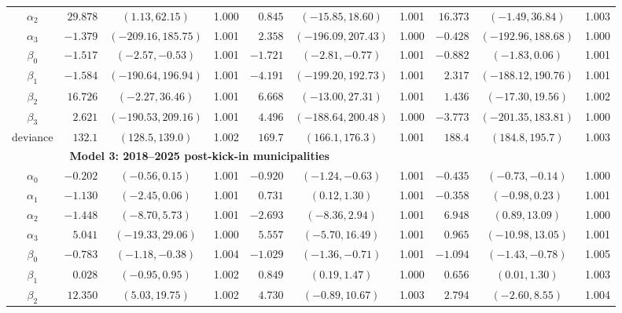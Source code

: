 \documentclass[letter,12pt]{article}
\newcommand{\mc}{\multicolumn}
\begin{document}
\begin{table}
{\begin{tabular}{c|rcr|rcr|rcr}
$\alpha_2$&  $29.878$ &     $(1.13, 62.15)$ & 1.000 & $ 0.845$ &        $(-15.85, 18.60)$ & 1.001 & $16.373$ &         $(-1.49, 36.84)$ & 1.003 \\
$\alpha_3$&  $-1.379$ & $(-209.16, 185.75)$ & 1.001 & $ 2.358$ &      $(-196.09, 207.43)$ & 1.000 & $-0.428$ &      $(-192.96, 188.68)$ & 1.000 \\
 $\beta_0$&  $-1.517$ &    $(-2.57, -0.53)$ & 1.001 & $-1.721$ &         $(-2.81, -0.77)$ & 1.001 & $-0.882$ &          $(-1.83, 0.06)$ & 1.001 \\
 $\beta_1$&  $-1.584$ & $(-190.64, 196.94)$ & 1.001 & $-4.191$ &      $(-199.20, 192.73)$ & 1.001 & $ 2.317$ &      $(-188.12, 190.76)$ & 1.001 \\
 $\beta_2$&  $16.726$ &    $(-2.27, 36.46)$ & 1.001 & $ 6.668$ &        $(-13.00, 27.31)$ & 1.001 & $ 1.436$ &        $(-17.30, 19.56)$ & 1.002 \\
 $\beta_3$&  $ 2.621$ & $(-190.53, 209.16)$ & 1.001 & $ 4.496$ &      $(-188.64, 200.48)$ & 1.000 & $-3.773$ &      $(-201.35, 183.81)$ & 1.000 \\
deviance  &  $ 132.1$ &      $(128.5, 139.0)$ & 1.002 & $ 169.7$ &           $(166.1, 176.3)$ & 1.001 & $ 188.4$ &           $(184.8, 195.7)$ & 1.003 \\
  & \mc{5}{l}{~\textbf{Model 3: 2018--2025 post-kick-in municipalities}} \\ %
$\alpha_0$&  $-0.202$ &     $(-0.56, 0.15)$ & 1.001 & $-0.920$ &         $(-1.24, -0.63)$ & 1.001 & $-0.435$ &         $(-0.73, -0.14)$ & 1.000 \\
$\alpha_1$&  $-1.130$ &     $(-2.45, 0.06)$ & 1.001 & $ 0.731$ &           $(0.12, 1.30)$ & 1.001 & $-0.358$ &          $(-0.98, 0.23)$ & 1.001 \\
$\alpha_2$&  $-1.448$ &     $(-8.70, 5.73)$ & 1.001 & $-2.693$ &          $(-8.36, 2.94)$ & 1.001 & $ 6.948$ &          $(0.89, 13.09)$ & 1.000 \\
$\alpha_3$&  $ 5.041$ &   $(-19.33, 29.06)$ & 1.000 & $ 5.557$ &         $(-5.70, 16.49)$ & 1.001 & $ 0.965$ &        $(-10.98, 13.05)$ & 1.001 \\
 $\beta_0$&  $-0.783$ &    $(-1.18, -0.38)$ & 1.004 & $-1.029$ &         $(-1.36, -0.71)$ & 1.001 & $-1.094$ &         $(-1.43, -0.78)$ & 1.005 \\
 $\beta_1$&  $ 0.028$ &     $(-0.95, 0.95)$ & 1.002 & $ 0.849$ &           $(0.19, 1.47)$ & 1.000 & $ 0.656$ &           $(0.01, 1.30)$ & 1.003 \\
 $\beta_2$&  $12.350$ &     $(5.03, 19.75)$ & 1.002 & $ 4.730$ &         $(-0.89, 10.67)$ & 1.003 & $ 2.794$ &          $(-2.60, 8.55)$ & 1.004 \\

\end{tabular}}
\end{table}
\end{document}
